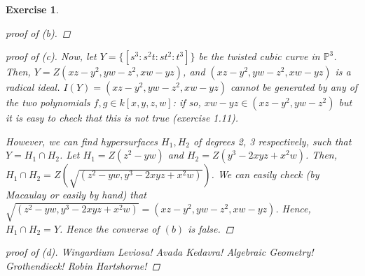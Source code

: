 \documentclass[12pt,letterpaper]{article}
\newtheorem{problem}{Exercise}[section]
\theoremstyle{definition}
\theoremstyle{remark}
\numberwithin{equation}{section}
\numberwithin{figure}{problem}
\newcommand{\PP}{\mathbb{P}}
\begin{document}
\begin{problem}
\begin{proof} [proof of (b)]
\end{proof}

\begin{proof} [proof of (c)] Now, let $Y = \{[s^3:s^2t:st^2:t^3]\}$ be the twisted cubic curve in $\PP^3$. Then, $Y = Z(xz-y^2, yw-z^2, xw-yz)$, and $(xz-y^2, yw-z^2, xw-yz)$ is a radical ideal. $I(Y)=(xz-y^2, yw-z^2, xw-yz)$ cannot be generated by any of the two polynomials $f,g \in k[x,y,z,w]$: if so, $xw-yz \in (xz-y^2, yw-z^2)$ but it is easy to check that this is not true (exercise 1.11).

However, we can find hypersurfaces $H_1, H_2$ of degrees 2, 3 respectively, such that $Y = H_1 \cap H_2$. Let $H_1 = Z(z^2-yw)$ and $H_2 = Z(y^3-2xyz+x^2w)$. Then, $H_1 \cap H_2 = Z(\sqrt{(z^2-yw, y^3-2xyz+x^2w)})$. We can easily check (by Macaulay or easily by hand) that $\sqrt{(z^2-yw, y^3-2xyz+x^2w)} = (xz-y^2, yw-z^2, xw-yz)$. Hence, $H_1 \cap H_2 = Y$. Hence the converse of $(b)$ is false. 

\end{proof}

\begin{proof} [proof of (d)] 

Wingardium Leviosa! Avada Kedavra! Algebraic Geometry! Grothendieck! Robin Hartshorne!
\end{proof}



\end{problem}


\printbibliography
\end{document}
